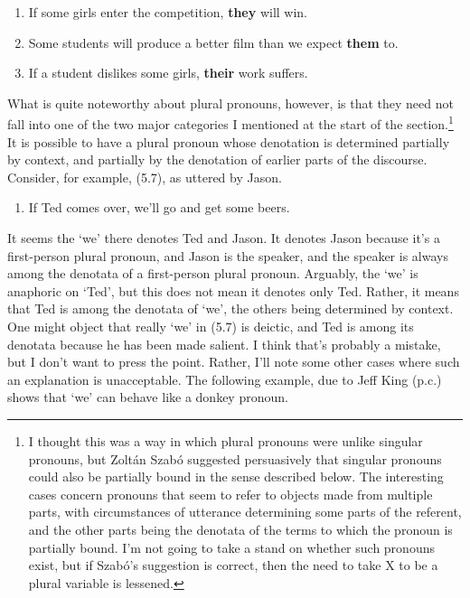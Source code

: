 \documentclass[
  11pt,
  letterpaper,
  DIV=11,
  numbers=noendperiod,
  twoside]{scrartcl}
\providecommand{\tightlist}{%
  \setlength{\itemsep}{0pt}\setlength{\parskip}{0pt}}
\begin{document}
\begin{enumerate}
\def\labelenumi{\arabic{enumi}.}
\setcounter{enumi}{3}
\tightlist
\item
  If some girls enter the competition, \textbf{they} will win.
\item
  Some students will produce a better film than we expect \textbf{them}
  to.
\item
  If a student dislikes some girls, \textbf{their} work suffers.
\end{enumerate}

What is quite noteworthy about plural pronouns, however, is that they
need not fall into one of the two major categories I mentioned at the
start of the section.\footnote{I thought this was a way in which plural
  pronouns were unlike singular pronouns, but Zoltán Szabó suggested
  persuasively that singular pronouns could also be partially bound in
  the sense described below. The interesting cases concern pronouns that
  seem to refer to objects made from multiple parts, with circumstances
  of utterance determining some parts of the referent, and the other
  parts being the denotata of the terms to which the pronoun is
  partially bound. I'm not going to take a stand on whether such
  pronouns exist, but if Szabó's suggestion is correct, then the need to
  take X to be a plural variable is lessened.} It is possible to have a
plural pronoun whose denotation is determined partially by context, and
partially by the denotation of earlier parts of the discourse. Consider,
for example, (5.7), as uttered by Jason.

\begin{enumerate}
\def\labelenumi{\arabic{enumi}.}
\setcounter{enumi}{6}
\tightlist
\item
  If Ted comes over, we'll go and get some beers.
\end{enumerate}

It seems the `we' there denotes Ted and Jason. It denotes Jason because
it's a first-person plural pronoun, and Jason is the speaker, and the
speaker is always among the denotata of a first-person plural pronoun.
Arguably, the `we' is anaphoric on `Ted', but this does not mean it
denotes only Ted. Rather, it means that Ted is among the denotata of
`we', the others being determined by context. One might object that
really `we' in (5.7) is deictic, and Ted is among its denotata because
he has been made salient. I think that's probably a mistake, but I don't
want to press the point. Rather, I'll note some other cases where such
an explanation is unacceptable. The following example, due to Jeff King
(p.c.) shows that `we' can behave like a donkey pronoun.
\end{document}
